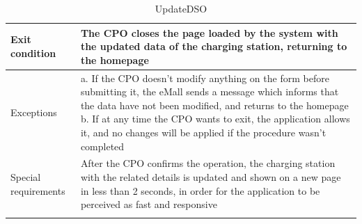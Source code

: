 \begin{center}
\begin{longtable}{p{4cm} p{11cm}}
     \hline
     Exit condition &  The CPO closes the page loaded by the system with the updated data of the charging station, returning to the homepage \\
     \hline
     Exceptions &   a. If the CPO doesn't modify anything on the form before submitting it, the eMall sends a                       message which informs that the data have not been modified, and returns to the homepage \newline
                    b. If at any time the CPO wants to exit, the application allows it, and no changes will be applied if the procedure wasn't completed \\
     \hline
     Special requirements & After the CPO confirms the operation, the charging station with the related details is updated and shown on a new page in less than 2 seconds, in order for the application to be perceived as fast and responsive \\
     \hline
    \caption{UpdateDSO}
    \label{tab:UpdateDSO}
    \end{longtable}
\end{center}

